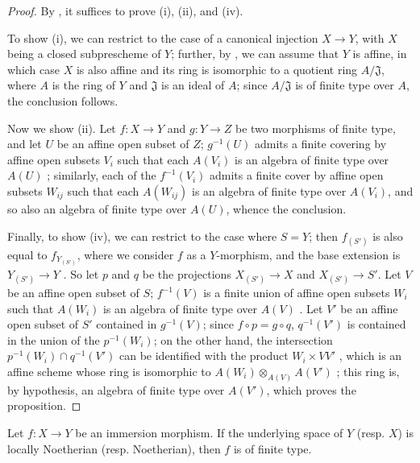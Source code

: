 \begin{proof}
By , it suffices to prove (i), (ii), and (iv).

To show (i), we can restrict to the case of a canonical injection $X\to Y$, with $X$ being a closed subprescheme of $Y$;
further, by , we can assume that $Y$ is affine, in which case $X$ is also affine  and its ring is isomorphic to a quotient ring $A/\mathfrak{J}$, where $A$ is the ring of $Y$ and $\mathfrak{J}$ is an ideal of $A$;
since $A/\mathfrak{J}$ is of finite type over $A$, the conclusion follows.

Now we show (ii).
Let $f:X\to Y$ and $g:Y\to Z$ be two morphisms of finite type, and let $U$ be an affine open subset of $Z$;
$g^{-1}(U)$ admits a finite covering by affine open subsets $V_i$ such that each $A(V_i)$ is an algebra of finite type over $A(U)$ ;
similarly, each
of the $f^{-1}(V_i)$ admits a finite cover by affine open subsets $W_{ij}$ such that each $A(W_{ij})$ is an algebra of finite type over $A(V_i)$, and so also an algebra of finite type over $A(U)$, whence the conclusion.

Finally, to show (iv), we can restrict to the case where $S=Y$;
then $f_{(S')}$ is also equal to $f_{Y_{(S')}}$, where we consider $f$ as a $Y$-morphism, and the base extension is $Y_{(S')}\to Y$ .
So let $p$ and $q$ be the projections $X_{(S')}\to X$ and $X_{(S')}\to S'$.
Let $V$ be an affine open subset of $S$;
$f^{-1}(V)$ is a finite union of affine open subsets $W_i$ such that $A(W_i)$ is an algebra of finite type over $A(V)$ .
Let $V'$ be an affine open subset of $S'$ contained in $g^{-1}(V)$;
since $f\circ p=g\circ q$, $q^{-1}(V')$ is contained in the union of the $p^{-1}(W_i)$;
on the other hand, the intersection $p^{-1}(W_i)\cap q^{-1}(V')$ can be identified with the product $W_i\times V V'$ , which is an affine scheme whose ring is isomorphic to $A(W_i)\otimes_{A(V)}A(V')$ ;
this ring is, by hypothesis, an algebra of finite type over $A(V')$, which proves the proposition.
\end{proof}

\begin{corollary}[6.3.5]
\label{I.6.3.5}
Let $f:X\to Y$ be an immersion morphism.
If the underlying space of $Y$ (resp. $X$) is locally Noetherian (resp. Noetherian), then $f$ is of finite type.
\end{corollary}


